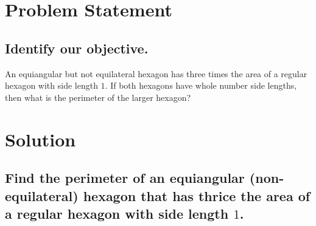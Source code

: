 \documentclass{beamer} %
\begin{document}
\begin{frame} %
  \titlepage
\end{frame}

\section{Problem Statement}

\subsection*{Identify our objective.}

\begin{frame}
An equiangular but not equilateral hexagon has three times the area of a regular hexagon with side length $1$. If both hexagons have whole number side lengths, then what is the perimeter of the larger hexagon?
\end{frame}

\section{Solution}

\subsection*{Find the perimeter of an equiangular (non-equilateral) hexagon that has thrice the area of a regular hexagon with side length \texorpdfstring{$1$}{1}.}
\end{document}
